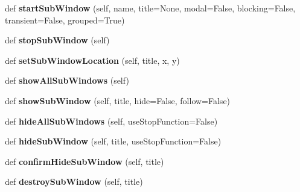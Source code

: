 \begin{DoxyCompactItemize}
def {\bfseries start\+Sub\+Window} (self, name, title=None, modal=False, blocking=False, transient=False, grouped=True)
\item 
\mbox{\label{class_python_01_g_u_i_1_1appjar_1_1gui_a7090f3825e8e00561cead0f9b1e74b48}} 
def {\bfseries stop\+Sub\+Window} (self)
\item 
\mbox{\label{class_python_01_g_u_i_1_1appjar_1_1gui_aabeed24815e953d496f02a75eed25e3a}} 
def {\bfseries set\+Sub\+Window\+Location} (self, title, x, y)
\item 
\mbox{\label{class_python_01_g_u_i_1_1appjar_1_1gui_a62985caa942c2048e8351fc7b0ecafdc}} 
def {\bfseries show\+All\+Sub\+Windows} (self)
\item 
\mbox{\label{class_python_01_g_u_i_1_1appjar_1_1gui_aa81ce6538221a58bacac87c589955989}} 
def {\bfseries show\+Sub\+Window} (self, title, hide=False, follow=False)
\item 
\mbox{\label{class_python_01_g_u_i_1_1appjar_1_1gui_a3f8dc1cb094d18c65dde422704a9b6cd}} 
def {\bfseries hide\+All\+Sub\+Windows} (self, use\+Stop\+Function=False)
\item 
\mbox{\label{class_python_01_g_u_i_1_1appjar_1_1gui_a6bcdd616d96f909f11c2e40c6cc474a2}} 
def {\bfseries hide\+Sub\+Window} (self, title, use\+Stop\+Function=False)
\item 
\mbox{\label{class_python_01_g_u_i_1_1appjar_1_1gui_aeb822f0699aca81f60b2b770ab1f3dab}} 
def {\bfseries confirm\+Hide\+Sub\+Window} (self, title)
\item 
\mbox{\label{class_python_01_g_u_i_1_1appjar_1_1gui_a05fc3be9cb5ea1feceb4253563c20f35}} 
def {\bfseries destroy\+Sub\+Window} (self, title)
\item 
\mbox{\label{class_python_01_g_u_i_1_1appjar_1_1gui_a7497ddb5f446fd24162fb62c47398a58}} 

\end{DoxyCompactItemize}
